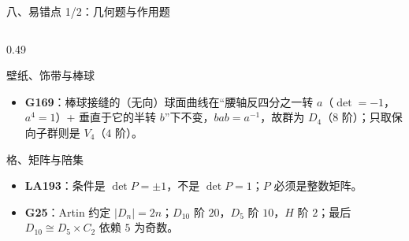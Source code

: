 \documentclass[aspectratio=169,10pt,fontset=none]{ctexbeamer}
\newcommand{\ex}[1]{\textcolor{accent}{\footnotesize\bfseries #1}}
\begin{document}
\begin{frame}[t]{八、易错点 1/2：几何题与作用题}
\begin{columns}[T,onlytextwidth]
\begin{column}{0.49\textwidth}
\begin{alertblock}{\footnotesize 壁纸、饰带与棒球}
\begin{itemize}
          \item \ex{G169}：棒球接缝的（无向）球面曲线在“腰轴反四分之一转 $a$（$\det=-1$，$a^4=1$）+ 垂直于它的半转 $b$”下不变，$bab=a^{-1}$，故群为 $D_4$（$8$ 阶）；只取保向子群则是 $V_4$（$4$ 阶）。
        \end{itemize}
      \end{alertblock}
      \begin{alertblock}{\footnotesize 格、矩阵与陪集}
        \scriptsize
        \begin{itemize}\setlength{\itemsep}{1pt}
          \item \ex{LA193}：条件是 $\det P=\pm1$，不是 $\det P=1$；$P$ 必须是整数矩阵。
          \item \ex{G25}：Artin 约定 $|D_n|=2n$；$D_{10}$ 阶 $20$，$D_5$ 阶 $10$，$H$ 阶 $2$；最后 $D_{10}\cong D_5\times C_2$ 依赖 $5$ 为奇数。
        \end{itemize}
      \end{alertblock}
    \end{column}
  \end{columns}
\end{frame}
\end{document}
